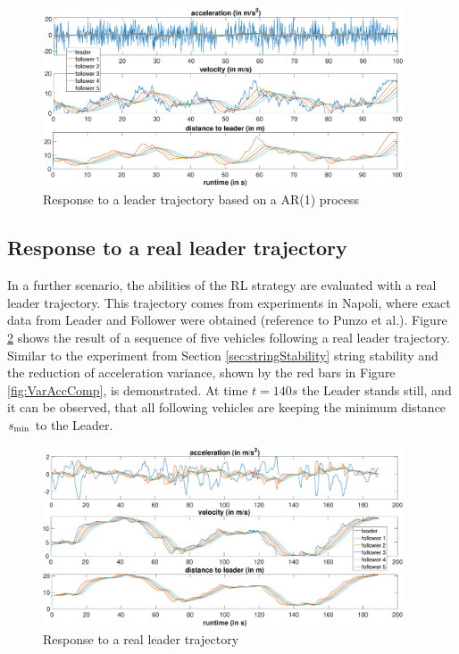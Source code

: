 \documentclass[review]{elsarticle}
\begin{document}
\begin{figure}
	\centering
	\includegraphics[width=0.95\textwidth]{images/AR1Kolonne}
	\caption{Response to a leader trajectory based on a AR(1) process}
	\label{fig:AR1Kolonne}
\end{figure}


\subsection{Response to a real leader trajectory}

In a further scenario, the abilities of the RL strategy are evaluated with a real leader trajectory. This trajectory comes from experiments in Napoli, where exact data from Leader and Follower were obtained (reference to Punzo et al.). Figure \ref{fig:PunzoKolonne} shows the result of a sequence of five vehicles following a real leader trajectory. Similar to the experiment from Section \ref{sec:stringStability} string stability and the reduction of acceleration variance, shown by the red bars in Figure \ref{fig:VarAccComp}, is demonstrated. At time $t = 140s$ the Leader stands still, and it can be observed, that all following vehicles are keeping the minimum distance $s_{\rm min}$ to the Leader. 


\begin{figure}
	\centering
	\includegraphics[width=0.95\textwidth]{images/PunzoKolonne}
	\caption{Response to a real leader trajectory}
	\label{fig:PunzoKolonne}
\end{figure}
\end{document}
